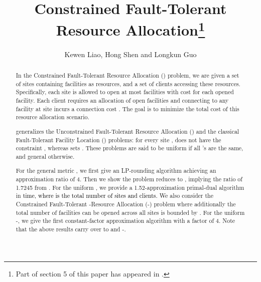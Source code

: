 \documentclass[10pt]{llncs}
\begin{document}
\title{Constrained Fault-Tolerant Resource Allocation\thanks{Part of section 5 of this paper has appeared in \cite{kewen2011cocoon}.}}


\author{\author{Kewen Liao, Hong Shen and Longkun Guo }}


\maketitle
\begin{abstract}
In the Constrained Fault-Tolerant Resource Allocation () problem,
we are given a set of sites containing facilities as resources, and
a set of clients accessing these resources. Specifically, each site
 is allowed to open at most  facilities with cost 
for each opened facility. Each client  requires an allocation
of  open facilities and connecting  to any facility at
site  incurs a connection cost . The goal is to minimize
the total cost of this resource allocation scenario.

\quad{}\enskip{} generalizes the Unconstrained Fault-Tolerant
Resource Allocation () \cite{kewen2011cocoon} and
the classical Fault-Tolerant Facility Location () \cite{Jain00FTFL}
problems: for every site ,  does not have the
constraint , whereas  sets . These problems
are said to be uniform if all 's are the same, and general
otherwise.

\quad{}\enskip{}For the general metric , we first give an
LP-rounding algorithm achieving an approximation ratio of 4. Then
we show the problem reduces to , implying the ratio of 1.7245
from \cite{JaroslawFTFL1.725}. For the uniform , we provide
a 1.52-approximation primal-dual algorithm in \textcolor{black}{
time, where  is the total number of sites and clients.} We also
consider the Constrained Fault-Tolerant -Resource Allocation (-)
problem where additionally the total number of facilities can be opened
across all sites is bounded by . For the uniform -,
we give the first constant-factor approximation algorithm with a factor
of 4. Note that the above results carry over to  and
-.
\end{abstract}
\thispagestyle{empty}
\end{document}
